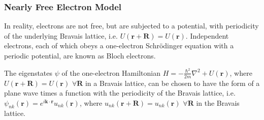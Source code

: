 \documentclass[a4paper]{article}
\begin{document}
\subsubsection*{Nearly Free Electron Model}
\begin{Note}
In reality, electrons are not free, but are subjected to a potential, with periodicity of the underlying Bravais lattice, i.e. $U(\mathbf{r}+\mathbf{R})=U(\mathbf{r})$. Independent electrons, each of which obeys a one-electron Schr\"{o}dinger equation with a periodic potential, are known as Bloch electrons. 
\end{Note}
\begin{thm}
The eigenstates $\psi$ of the one-electron Hamiltonian $H=-\frac{\hbar^2}{2m}\nabla^2+U(\mathbf{r})$, where $U(\mathbf{r}+\mathbf{R})=U(\mathbf{r})$ $\forall\mathbf{R}$ in a Bravais lattice, can be chosen to have the form of a plane wave times a function with the periodicity of the Bravais lattice, i.e. $\psi_{nk}(\mathbf{r})=e^{i\mathbf{k}\cdot\mathbf{r}}u_{nk}(\mathbf{r})$, where $u_{nk}(\mathbf{r}+\mathbf{R})=u_{nk}(\mathbf{r})$ $\forall\mathbf{R}$ in the Bravais lattice.
\end{thm}
\end{document}
